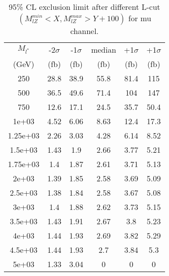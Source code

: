 \documentclass[]{article}
\begin{document}
\begin{table}
\begin{center}
\begin{tabular}{cccccc}
\hline 
\hline 
$M_{l^*}$ & -2$\sigma$ & -1$\sigma$ & median & +1$\sigma$ & +1$\sigma$\\ 
(GeV) & (fb) & (fb) & (fb) & (fb) & (fb)  \\ 
\hline 
\hline 
250 & 28.8 & 38.9 & 55.8 & 81.4 & 115\\
500 & 36.5 & 49.6 & 71.4 & 104 & 147\\
750 & 12.6 & 17.1 & 24.5 & 35.7 & 50.4\\
1e+03 & 4.52 & 6.06 & 8.63 & 12.4 & 17.3\\
1.25e+03 & 2.26 & 3.03 & 4.28 & 6.14 & 8.52\\
1.5e+03 & 1.43 & 1.9 & 2.66 & 3.77 & 5.21\\
1.75e+03 & 1.4 & 1.87 & 2.61 & 3.71 & 5.13\\
2e+03 & 1.39 & 1.85 & 2.58 & 3.69 & 5.09\\
2.5e+03 & 1.38 & 1.84 & 2.58 & 3.67 & 5.08\\
3e+03 & 1.4 & 1.88 & 2.62 & 3.73 & 5.15\\
3.5e+03 & 1.43 & 1.91 & 2.67 & 3.8 & 5.23\\
4e+03 & 1.44 & 1.93 & 2.69 & 3.82 & 5.29\\
4.5e+03 & 1.44 & 1.93 & 2.7 & 3.84 & 5.3\\
5e+03 & 1.33 & 3.04 & 0 & 0 & 0\\
\hline 
\end{tabular}
\caption{95\% CL exclusion limit after different L-cut $(M_{lZ}^{min} < X, M_{lZ}^{max} > Y + 100)$ for mu channel.}
\label{tab:limit_muon}
\end{center}
\end{table}
\end{document}
